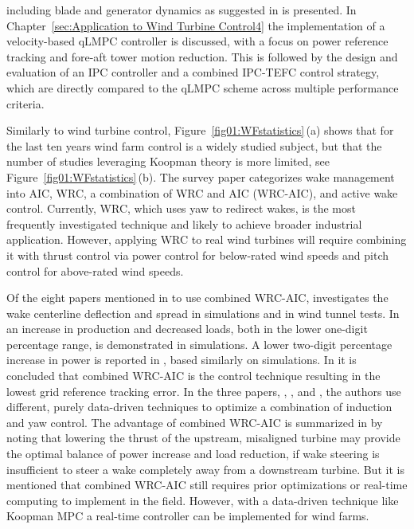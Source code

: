 including blade and generator dynamics as suggested in \cite{Bianchi2007} is presented. In Chapter~\ref{sec:Application to Wind Turbine Control4} the implementation of a velocity-based qLMPC controller is discussed, with a focus on power reference tracking and fore-aft tower motion reduction. This is followed by the design and evaluation of an IPC controller and a combined IPC-TEFC control strategy, which are directly compared to the qLMPC scheme across multiple performance criteria.

Similarly to wind turbine control, Figure~\ref{fig01:WFstatistics}\,(a) shows that for the last ten years wind farm control is a widely studied subject, but that the number of studies leveraging Koopman theory is more limited, see Figure~\ref{fig01:WFstatistics}\,(b). The survey paper \cite{houck2022review} categorizes wake management into AIC, WRC, a combination of WRC and AIC (WRC-AIC), and active wake control. Currently, WRC, which uses yaw to redirect wakes, is the most frequently investigated technique and likely to achieve broader industrial application. However, applying WRC to real wind turbines will require combining it with thrust control via power control for below-rated wind speeds and pitch control for above-rated wind speeds.

Of the eight papers mentioned in \cite{houck2022review} to use combined WRC-AIC, \cite{jimenez2010application} investigates the wake centerline deflection and spread in simulations and \cite{castillo2020wind} in wind tunnel tests. In \cite{bossanyi2018combining} an increase in production and decreased loads, both in the lower one-digit percentage range, is demonstrated in simulations. A lower two-digit percentage increase in power is reported in \cite{cossu2020wake}, based similarly on simulations. In \cite{fleming2016computational} it is concluded that combined WRC-AIC is the control technique resulting in the lowest grid reference tracking error. In the three papers, \cite{park2013wind}, \cite{park2015cooperative}, and \cite{en10070852}, the authors use different, purely data-driven techniques to optimize a combination of induction and yaw control. The advantage of combined WRC-AIC is summarized in \cite{houck2022review} by noting that lowering the thrust of the upstream, misaligned turbine may provide the optimal balance of power increase and load reduction, if wake steering is insufficient to steer a wake completely away from a downstream turbine. But it is mentioned that combined WRC-AIC still requires prior optimizations or real-time computing to implement in the field. However, with a data-driven technique like Koopman MPC a real-time controller can be implemented for wind farms. 

